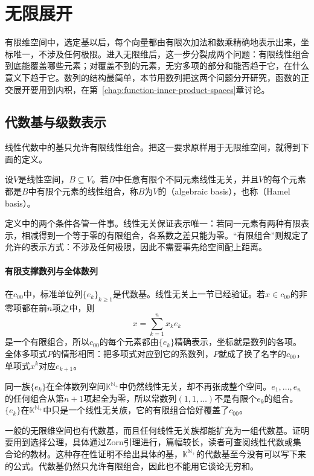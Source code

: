 \section{无限展开}
\label{sec:fvec-infinite-expansions}

有限维空间中，选定基以后，每个向量都由有限次加法和数乘精确地表示出来，坐标唯一，不涉及任何极限。进入无限维后，这一步分裂成两个问题：有限线性组合到底能覆盖哪些元素；对覆盖不到的元素，无穷多项的部分和能否趋于它，在什么意义下趋于它。数列的结构最简单，本节用数列把这两个问题分开研究，函数的正交展开要用到内积，在第~\ref{chap:function-inner-product-spaces}章讨论。

\subsection{代数基与级数表示}
\label{sec:fvec-algebraic-basis-series}

线性代数中的基只允许有限线性组合。把这一要求原样用于无限维空间，就得到下面的定义。

\begin{definition}[代数基]
\label{def:fvec-algebraic-basis}
设$V$是线性空间，$B\subseteq V$。若$B$中任意有限个不同元素线性无关，并且$V$的每个元素都是$B$中有限个元素的线性组合，称$B$为$V$的（algebraic basis），也称（Hamel basis）。
\end{definition}

定义中的两个条件各管一件事。线性无关保证表示唯一：若同一元素有两种有限表示，相减得到一个等于零的有限组合，各系数之差只能为零。“有限组合”则规定了允许的表示方式：不涉及任何极限，因此不需要事先给空间配上距离。

\paragraph{有限支撑数列与全体数列}
在$c_{00}$中，标准单位列$\{e_k\}_{k\geq1}$是代数基。线性无关上一节已经验证。若$x\in c_{00}$的非零项都在前$n$项之中，则
\[
 x=\sum_{k=1}^nx_ke_k
\]
是一个有限组合，所以$c_{00}$的每个元素都由$\{e_k\}$精确表示，坐标就是数列的各项。全体多项式$P$的情形相同：把多项式对应到它的系数列，$P$就成了换了名字的$c_{00}$，单项式$x^k$对应$e_{k+1}$。

同一族$\{e_k\}$在全体数列空间$\mathbb K^{\mathbb N_+}$中仍然线性无关，却不再张成整个空间。$e_1,\ldots,e_n$的任何组合从第$n+1$项起全为零，所以常数列$(1,1,\ldots)$不是有限个$e_k$的组合。$\{e_k\}$在$\mathbb K^{\mathbb N_+}$中只是一个线性无关族，它的有限组合恰好覆盖了$c_{00}$。

一般的无限维空间也有代数基，而且任何线性无关族都能扩充为一组代数基。证明要用到选择公理，具体通过Zorn引理进行，篇幅较长，读者可查阅线性代数或集合论的教材。这种存在性证明不给出具体的基，$\mathbb K^{\mathbb N_+}$的代数基至今没有可以写下来的公式。代数基仍然只允许有限组合，因此也不能用它谈论无穷和。


